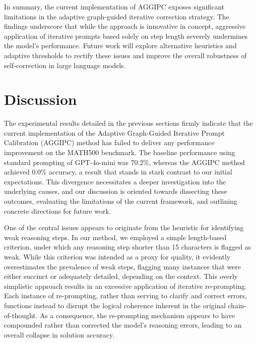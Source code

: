 \documentclass[11pt]{article}
\begin{document}
In summary, the current implementation of AGGIPC exposes significant limitations in the adaptive graph-guided iterative correction strategy. The findings underscore that while the approach is innovative in concept, aggressive application of iterative prompts based solely on step length severely undermines the model’s performance. Future work will explore alternative heuristics and adaptive thresholds to rectify these issues and improve the overall robustness of self-correction in large language models.

\section{Discussion}
The experimental results detailed in the previous sections firmly indicate that the current implementation of the Adaptive Graph-Guided Iterative Prompt Calibration (AGGIPC) method has failed to deliver any performance improvement on the MATH500 benchmark. The baseline performance using standard prompting of GPT-4o-mini was 70.2\%, whereas the AGGIPC method achieved 0.0\% accuracy, a result that stands in stark contrast to our initial expectations. This divergence necessitates a deeper investigation into the underlying causes, and our discussion is oriented towards dissecting these outcomes, evaluating the limitations of the current framework, and outlining concrete directions for future work.

One of the central issues appears to originate from the heuristic for identifying weak reasoning steps. In our method, we employed a simple length-based criterion, under which any reasoning step shorter than 15 characters is flagged as weak. While this criterion was intended as a proxy for quality, it evidently overestimates the prevalence of weak steps, flagging many instances that were either succinct or adequately detailed, depending on the context. This overly simplistic approach results in an excessive application of iterative re-prompting. Each instance of re-prompting, rather than serving to clarify and correct errors, functions instead to disrupt the logical coherence inherent in the original chain-of-thought. As a consequence, the re-prompting mechanism appears to have compounded rather than corrected the model's reasoning errors, leading to an overall collapse in solution accuracy.
\end{document}
